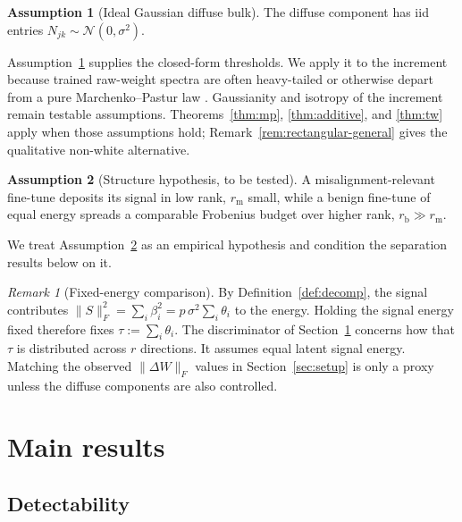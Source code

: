 \documentclass[11pt]{article}
\theoremstyle{definition}
\newtheorem{assumption}{Assumption}
\theoremstyle{remark}
\newtheorem{remark}[theorem]{Remark}
\newcommand{\norm}[1]{\lVert #1 \rVert}
\newcommand{\dW}{\Delta W}
\begin{document}
\begin{assumption}[Ideal Gaussian diffuse bulk]
\label{ass:bulk}
The diffuse component has iid entries $N_{jk}\sim\mathcal N(0,\sigma^2)$.
\end{assumption}

Assumption~\ref{ass:bulk} supplies the closed-form thresholds. We apply it to the
increment because trained raw-weight spectra are often heavy-tailed or otherwise depart
from a pure Marchenko--Pastur law \cite{martin2021}. Gaussianity and isotropy of the
increment remain testable assumptions. Theorems~\ref{thm:mp}, \ref{thm:additive}, and
\ref{thm:tw} apply when those assumptions hold; Remark~\ref{rem:rectangular-general}
gives the qualitative non-white alternative.

\begin{assumption}[Structure hypothesis, to be tested]
\label{ass:structure}
A misalignment-relevant fine-tune deposits its signal in low rank, $r_{\mathrm m}$ small,
while a benign fine-tune of equal energy spreads a comparable Frobenius budget over higher
rank, $r_{\mathrm b} \gg r_{\mathrm m}$.
\end{assumption}

We treat Assumption~\ref{ass:structure} as an empirical hypothesis and condition the
separation results below on it.

\begin{remark}[Fixed-energy comparison]
\label{rem:energy}
By Definition~\ref{def:decomp}, the signal contributes
$\norm{S}_F^2 = \sum_i \beta_i^2 = p\,\sigma^2 \sum_i \theta_i$ to the energy. Holding the
signal energy fixed therefore fixes $\tau := \sum_i \theta_i$. The discriminator
of Section~\ref{sec:results} concerns how that $\tau$ is distributed across
$r$ directions. It assumes equal latent signal energy. Matching the observed
$\norm{\dW}_F$ values in Section~\ref{sec:setup} is only a proxy unless the diffuse
components are also controlled.
\end{remark}

\section{Main results}
\label{sec:results}

\subsection{Detectability}
\end{document}

